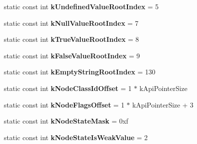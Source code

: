 \begin{DoxyCompactItemize}
\item 
\hypertarget{classv8_1_1internal_1_1_internals_a7281ff0eafed559e64613465b1a03296}{}static const int {\bfseries k\+Undefined\+Value\+Root\+Index} = 5\label{classv8_1_1internal_1_1_internals_a7281ff0eafed559e64613465b1a03296}

\item 
\hypertarget{classv8_1_1internal_1_1_internals_ab311cf753ec5c968052bd83ef21e83f8}{}static const int {\bfseries k\+Null\+Value\+Root\+Index} = 7\label{classv8_1_1internal_1_1_internals_ab311cf753ec5c968052bd83ef21e83f8}

\item 
\hypertarget{classv8_1_1internal_1_1_internals_a93abd58b178eca469bade28e68b5c59e}{}static const int {\bfseries k\+True\+Value\+Root\+Index} = 8\label{classv8_1_1internal_1_1_internals_a93abd58b178eca469bade28e68b5c59e}

\item 
\hypertarget{classv8_1_1internal_1_1_internals_a90b6837aa368bbe4ffd914e6f753b167}{}static const int {\bfseries k\+False\+Value\+Root\+Index} = 9\label{classv8_1_1internal_1_1_internals_a90b6837aa368bbe4ffd914e6f753b167}

\item 
\hypertarget{classv8_1_1internal_1_1_internals_a6f669f3d98fe653b281b26be3bc0655a}{}static const int {\bfseries k\+Empty\+String\+Root\+Index} = 130\label{classv8_1_1internal_1_1_internals_a6f669f3d98fe653b281b26be3bc0655a}

\item 
\hypertarget{classv8_1_1internal_1_1_internals_af4fb6d499cb87f03031ad4d6be6bcd8f}{}static const int {\bfseries k\+Node\+Class\+Id\+Offset} = 1 $\ast$ k\+Api\+Pointer\+Size\label{classv8_1_1internal_1_1_internals_af4fb6d499cb87f03031ad4d6be6bcd8f}

\item 
\hypertarget{classv8_1_1internal_1_1_internals_aee5606f2a44d43d8dafe344e0bb753ef}{}static const int {\bfseries k\+Node\+Flags\+Offset} = 1 $\ast$ k\+Api\+Pointer\+Size + 3\label{classv8_1_1internal_1_1_internals_aee5606f2a44d43d8dafe344e0bb753ef}

\item 
\hypertarget{classv8_1_1internal_1_1_internals_a853acc088978d38a5a69091cf857a46d}{}static const int {\bfseries k\+Node\+State\+Mask} = 0xf\label{classv8_1_1internal_1_1_internals_a853acc088978d38a5a69091cf857a46d}

\item 
\hypertarget{classv8_1_1internal_1_1_internals_a8a5d4cc92a6952c2a50922c77a606e68}{}static const int {\bfseries k\+Node\+State\+Is\+Weak\+Value} = 2\label{classv8_1_1internal_1_1_internals_a8a5d4cc92a6952c2a50922c77a606e68}


\end{DoxyCompactItemize}
